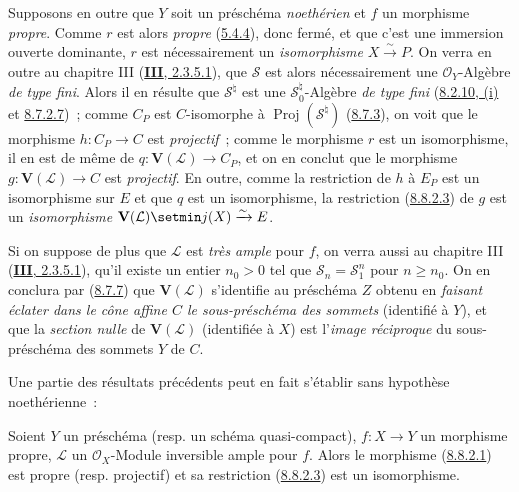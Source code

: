 \begin{remark}[8.8.3]
\label{II.8.8.3-fr}
Supposons en outre que $Y$ soit un préschéma \emph{noethérien} et $f$ un
morphisme \emph{propre}. Comme $r$ est alors \emph{propre}
(\hyperref[II.5.4.4-fr]{5.4.4}), donc fermé, et que c'est une immersion ouverte
dominante, $r$ est nécessairement un \emph{isomorphisme}
$X\xrightarrow{\sim}P$. On verra en outre au chapitre III
(\hyperref[III.2.3.5.1-fr]{\textbf{III}, 2.3.5.1}), que $\mathcal{S}$ est alors
nécessairement une $\mathcal{O}_Y$-Algèbre \emph{de type fini}. Alors il en
résulte que $\mathcal{S}^{\natural}$ est une
$\mathcal{S}_0^{\natural}$-Algèbre \emph{de type fini}
(\hyperref[II.8.2.10-fr]{8.2.10, (i)} et
\hyperref[II.8.7.2.7-fr]{8.7.2.7})~; comme $C_P$ est $C$-isomorphe à
$\operatorname{Proj}(\mathcal{S}^{\natural})$
(\hyperref[II.8.7.3-fr]{8.7.3}), on voit que le morphisme $h:C_P\to C$ est
\emph{projectif}~; comme le morphisme $r$ est un isomorphisme, il en est de
même de $q:\mathbf{V}(\mathcal{L})\to C_P$, et on en conclut que le morphisme
$g:\mathbf{V}(\mathcal{L})\to C$ est \emph{projectif}. En outre, comme la
restriction de $h$ à $E_P$ est un isomorphisme sur $E$ et que $q$ est un
isomorphisme, la restriction (\hyperref[II.8.8.2.3-fr]{8.8.2.3}) de $g$ est un
\emph{isomorphisme}
$\mathbf{V}(\mathcal{L})\setmin j(X)\xrightarrow{\sim}E$.

Si on suppose de plus que $\mathcal{L}$ est \emph{très ample} pour $f$, on
verra aussi au chapitre III (\hyperref[III.2.3.5.1-fr]{\textbf{III}, 2.3.5.1}), qu'il
existe un entier $n_0>0$ tel que
$\mathcal{S}_n=\mathcal{S}_1^n$ pour $n\geqslant n_0$. On en conclura par
(\hyperref[II.8.7.7-fr]{8.7.7}) que $\mathbf{V}(\mathcal{L})$ s'identifie au
préschéma $Z$ obtenu en \emph{faisant éclater dans le cône affine $C$ le
sous-préschéma des sommets} (identifié à $Y$), et que la \emph{section nulle}
de $\mathbf{V}(\mathcal{L})$ (identifiée à $X$) est l'\emph{image réciproque}
du sous-préschéma des sommets $Y$ de $C$.

Une partie des résultats précédents
peut en fait s'établir sans hypothèse noethérienne~:
\end{remark}

\begin{corollary}[8.8.4]
\label{II.8.8.4-fr}
Soient $Y$ un préschéma \textup{(resp.} un schéma quasi-compact\textup{)}, $f:X\to Y$ un
morphisme propre, $\mathcal{L}$ un $\mathcal{O}_X$-Module inversible ample pour
$f$. Alors le morphisme \textup{(\hyperref[II.8.8.2.1-fr]{8.8.2.1})} est propre \textup{(resp.}
projectif\textup{)} et sa restriction \textup{(\hyperref[II.8.8.2.3-fr]{8.8.2.3})} est un
isomorphisme.
\end{corollary}

